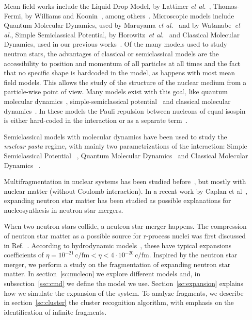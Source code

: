 Mean field works include the Liquid Drop Model, by Lattimer \emph{et
  al.}~\cite{page_minimal_2004}, Thomas-Fermi, by Williams and
Koonin~\cite{williams_sub-saturation_1985}, among
others~\cite{oyamatsu_nuclear_1993, lorenz_neutron_1993,
  cheng_properties_1997, watanabe_thermodynamic_2000,
  watanabe_electron_2003, nakazato_gyroid_2009}. Microscopic models
include Quantum Molecular Dynamics, used by Maruyama \emph{et
  al.}~\cite{maruyama_quantum_1998, kido_md_2000} and by
Watanabe~\emph{et al.}\cite{watanabe_structure_2003}, Simple
Semiclassical Potential, by Horowitz~\emph{et
  al.}~\cite{horowitz_nonuniform_2004} and Classical Molecular
Dynamics, used in our previous works~\cite{dorso_topological_2012}.
Of the many models used to study neutron stars, the advantages of
classical or semiclassical models are the accessibility to position
and momentum of all particles at all times and the fact that no
specific shape is hardcoded in the model, as happens with most mean
field models. This allows the study of the structure of the nuclear
medium from a particle-wise point of view. Many models exist with this
goal, like quantum molecular dynamics~\cite{maruyama_quantum_1998},
simple-semiclassical potential~\cite{horowitz_nonuniform_2004} and
classical molecular dynamics~\cite{lenk_accuracy_1990}. In these
models the Pauli repulsion between nucleons of equal isospin is either
hard-coded in the interaction or as a separate
term~\cite{dorso_classical_1988}.


Semiclassical models with molecular dynamics have been used to study
the \emph{nuclear pasta} regime, with mainly two parametrizations of
the interaction: Simple Semiclassical Potential
~\cite{horowitz_nonuniform_2004}, Quantum Molecular
Dynamics~\cite{maruyama_quantum_1998} and Classical Molecular Dynamics
~\cite{dorso_topological_2012, alcain_beyond_2014}.

Multifragmentation in nuclear systems has been studied
before~\cite{bonasera_critical_2000, chikazumi_quantum_2001}, but
mostly with nuclear matter (without Coulomb interaction). In a recent
work by Caplan et al~\cite{caplan_pasta_2015}, expanding neutron star
matter has been studied as possible explanations for nucleosynthesis
in neutron star mergers.

When two neutron stars collide, a neutron star merger happens. The
compression of neutron star matter as a possible source for r-process
nuclei was first discussed in Ref.~\cite{lattimer_black-hole-neutron-star_1974}.
According to hydrodynamic models~\cite{goriely_r-process_2011}, these
have typical expansions coefficients of $\eta = 10^{-21}\,\text{c/fm} <
\eta < 4\cdot 10^{-20}\,\text{c/fm}$. Inspired by the neutron star
merger, we perform a study on the fragmentation of expanding neutron
star matter. In section~\ref{sc:nucleon} we explore different models
and, in subsection~\ref{ssc:cmd} we define the model we
use. Section~\ref{sc:expansion} explains how we simulate the expansion
of the system. To analyze fragments, we describe in
section~\ref{sc:cluster} the cluster recognition algorithm, with
emphasis on the identification of infinite fragments.

